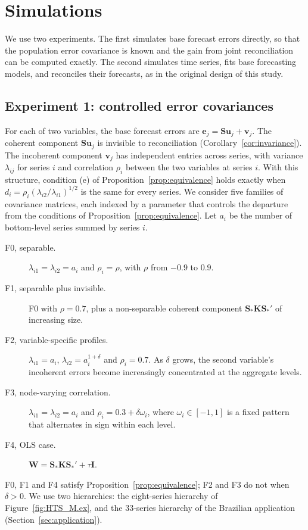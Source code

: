 
\section{Simulations}
\label{sec:simulation}

We use two experiments. The first simulates base forecast errors directly, so that the population error covariance is known and the gain from joint reconciliation can be computed exactly. The second simulates time series, fits base forecasting models, and reconciles their forecasts, as in the original design of this study.

\subsection{Experiment 1: controlled error covariances}

For each of two variables, the base forecast errors are $\bm{e}_j = \bm{S}\bm{u}_j + \bm{v}_j$. The coherent component $\bm{S}\bm{u}_j$ is invisible to reconciliation (Corollary~\ref{cor:invariance}). The incoherent component $\bm{v}_j$ has independent entries across series, with variance $\lambda_{ij}$ for series $i$ and correlation $\rho_i$ between the two variables at series $i$. With this structure, condition (e) of Proposition~\ref{prop:equivalence} holds exactly when $d_i = \rho_i(\lambda_{i2}/\lambda_{i1})^{1/2}$ is the same for every series. We consider five families of covariance matrices, each indexed by a parameter that controls the departure from the conditions of Proposition~\ref{prop:equivalence}. Let $a_i$ be the number of bottom-level series summed by series $i$.
\begin{description}
  \item[F0, separable.] $\lambda_{i1} = \lambda_{i2} = a_i$ and $\rho_i = \rho$, with $\rho$ from $-0.9$ to $0.9$.
  \item[F1, separable plus invisible.] F0 with $\rho = 0.7$, plus a non-separable coherent component $\bm{S}_*\bm{K}\bm{S}_*'$ of increasing size.
  \item[F2, variable-specific profiles.] $\lambda_{i1} = a_i$, $\lambda_{i2} = a_i^{1+\delta}$ and $\rho_i = 0.7$. As $\delta$ grows, the second variable's incoherent errors become increasingly concentrated at the aggregate levels.
  \item[F3, node-varying correlation.] $\lambda_{i1} = \lambda_{i2} = a_i$ and $\rho_i = 0.3 + \delta\omega_i$, where $\omega_i \in [-1, 1]$ is a fixed pattern that alternates in sign within each level.
  \item[F4, OLS case.] $\bm{W} = \bm{S}_*\bm{K}\bm{S}_*' + \tau\bm{I}$.
\end{description}
F0, F1 and F4 satisfy Proposition~\ref{prop:equivalence}; F2 and F3 do not when $\delta > 0$. We use two hierarchies: the eight-series hierarchy of Figure~\ref{fig:HTS_M.ex}, and the 33-series hierarchy of the Brazilian application (Section~\ref{sec:application}).

